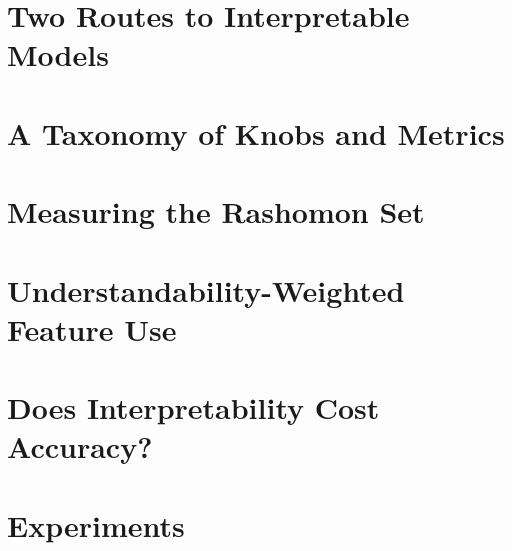 \section{Two Routes to Interpretable Models}
\label{sec:iq-two-routes}

\section{A Taxonomy of Knobs and Metrics}
\label{sec:iq-taxonomy}

\section{Measuring the Rashomon Set}
\label{sec:iq-rashomon}

\section{Understandability-Weighted Feature Use}
\label{sec:iq-uw-knob}

\section{Does Interpretability Cost Accuracy?}
\label{sec:iq-cost}

\section{Experiments}
\label{sec:iq-experiments}
